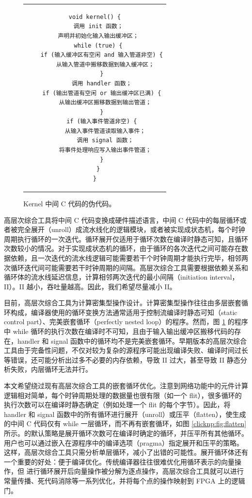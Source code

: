 \begin{figure}[htbp]
	\small
	\centering
	\begin{tabular}{c}
\begin{lstlisting}
void kernel() {
  调用 init 函数；
  声明并初始化输入输出缓冲区；
  while (true) {
    if (输入缓冲区有空闲 and 输入管道非空) {
      从输入管道中搬移数据到输入缓冲区；
    }
    调用 handler 函数；
    if (输出管道有空闲 or 输出缓冲区已满) {
      从输出缓冲区搬移数据到输出管道；
    }
    if (输入事件管道非空) {
      从输入事件管道读取输入事件；
      调用 signal 函数；
      将事件处理响应写入输出事件管道；
    }
  }
}
\end{lstlisting}
	\end{tabular}
	\caption{Kernel 中间 C 代码的伪代码。}
	\label{clicknp:fig:intermediate-c}
\end{figure}

高层次综合工具将中间 C 代码变换成硬件描述语言，中间 C 代码中的每层循环或者被完全展开（unroll）成流水线化的逻辑模块，或者被实现成状态机，每个时钟周期执行循环的一次迭代。循环展开仅适用于循环次数在编译时静态可知，且循环次数较小的情况。对于实现成状态机的循环，由于循环的各次迭代之间可能存在数据依赖，且一次迭代的流水线逻辑可能需要若干个时钟周期才能执行完毕，相邻两次循环迭代间可能需要若干时钟周期的间隔。高层次综合工具需要根据依赖关系和循环体的流水线延迟信息，计算相邻两次迭代的最小间隔（initiation interval，II）。II 越小，吞吐量越高。因此，我们希望尽量减小 II。

目前，高层次综合工具为计算密集型操作设计。计算密集型操作往往由多层嵌套循环构成，编译器使用的循环变换方法通常适用于控制流编译时静态可知（static control part）、完美嵌套循环（perfectly nested loop）的程序。然而，图 \ref{clicknp:fig:intermediate-c} 的程序中 while 循环的执行次数在编译时不可知，且由于输入输出缓冲区搬移代码的存在，handler 和 signal 函数中的循环均不是完美嵌套循环。早期版本的高层次综合工具由于完备性问题，不仅对较为复杂的源程序可能出现编译失败、编译时间过长等错误，还可能分析出过多不必要的内存依赖，导致 II 过大，甚至导致 II 静态分析失败，内层循环无法并行。

本文希望绕过现有高层次综合工具的嵌套循环优化。注意到网络功能中的元件计算逻辑相对简单，每个时钟周期处理的数据量也很有限（如一个 flit），很多循环的执行次数可以在编译时静态确定（例如处理一个 flit 的每个字节）。因此，\name 将 handler 和 signal 函数中的所有循环进行展开（unroll）或压平（flatten），使生成的中间 C 代码仅有 while 一层循环，而不再有嵌套循环，如图 \ref{clicknp:fig:flatten} 所示。\name 的默认策略是展开循环次数可在编译时确定的循环，并压平所有其他循环。用户也可以通过嵌入在源程序中的编译选项（pragma）指定展开和压平的策略。这样，高层次综合工具只需分析单层循环，减小了出错的可能性。展开循环体还有一个重要的好处：便于编译优化。传统编译器往往很难优化用循环表示的向量操作，但 \name 进行循环展开后向量操作被分解为逐点操作，高层次综合工具就可以进行常量传播、死代码消除等一系列优化，并将每个点的操作映射到 FPGA 上的逻辑门。

